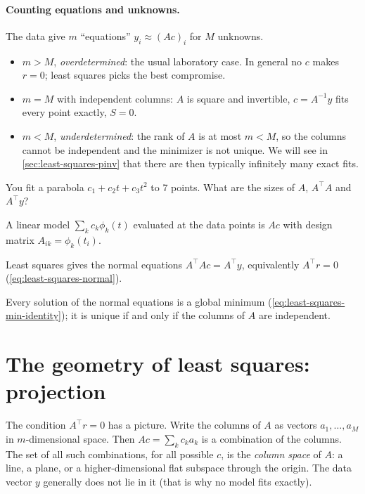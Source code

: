 \paragraph{Counting equations and unknowns.} The data give $m$ ``equations'' $y_i \approx (Ac)_i$ for $M$ unknowns.
\begin{itemize}
\item $m > M$, \emph{overdetermined}: the usual laboratory case. In general no $c$ makes $r=0$; least squares picks the best compromise.
\item $m = M$ with independent columns: $A$ is square and invertible, $c = A^{-1}y$ fits every point exactly, $S=0$.
\item $m < M$, \emph{underdetermined}: the rank of $A$ is at most $m < M$, so the columns cannot be independent and the minimizer is not unique. We will see in \cref{sec:least-squares-pinv} that there are then typically infinitely many exact fits.
\end{itemize}

\begin{checkpoint}
You fit a parabola $c_1 + c_2t + c_3t^2$ to 7 points. What are the sizes of $A$, $A^\top A$ and $A^\top y$?
\end{checkpoint}

\begin{keyideas}
\item A linear model $\sum_k c_k\phi_k(t)$ evaluated at the data points is $Ac$ with design matrix $A_{ik}=\phi_k(t_i)$.
\item Least squares gives the normal equations $A^\top A c = A^\top y$, equivalently $A^\top r = 0$ (\cref{eq:least-squares-normal}).
\item Every solution of the normal equations is a global minimum (\cref{eq:least-squares-min-identity}); it is unique if and only if the columns of $A$ are independent.
\end{keyideas}

\section{The geometry of least squares: projection}\label{sec:least-squares-projection}

The condition $A^\top r = 0$ has a picture. Write the columns of $A$ as vectors $a_1,\dots,a_M$ in $m$-dimensional space. Then $Ac = \sum_k c_k a_k$ is a combination of the columns. The set of all such combinations, for all possible $c$, is the \emph{column space} of $A$: a line, a plane, or a higher-dimensional flat subspace through the origin. The data vector $y$ generally does not lie in it (that is why no model fits exactly).

